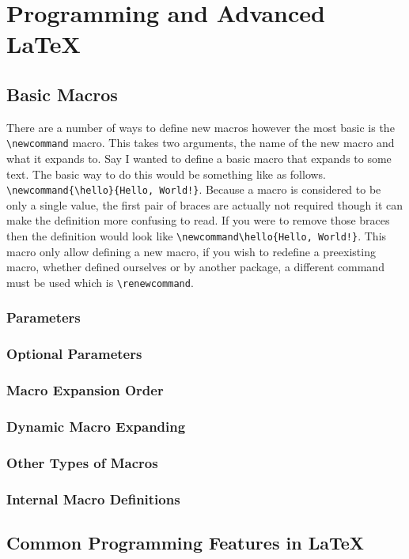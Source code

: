 \section{Programming and Advanced LaTeX}

\subsection{Basic Macros}
There are a number of ways to define new macros however the most basic is the \verb=\newcommand= macro. This takes two arguments, the name of the new macro and what it expands to. Say I wanted to define a basic macro that expands to some text. The basic way to do this would be something like as follows. \verb=\newcommand{\hello}{Hello, World!}=. Because a macro is considered to be only a single value, the first pair of braces are actually not required though it can make the definition more confusing to read. If you were to remove those braces then the definition would look like \verb=\newcommand\hello{Hello, World!}=. This macro only allow defining a new macro, if you wish to redefine a preexisting macro, whether defined ourselves or by another package, a different command must be used which is \verb=\renewcommand=.
\subsubsection{Parameters}
\subsubsection{Optional Parameters}
\subsubsection{Macro Expansion Order}
\subsubsection{Dynamic Macro Expanding}
\subsubsection{Other Types of Macros}
\subsubsection{Internal Macro Definitions}

\subsection{Common Programming Features in LaTeX}
